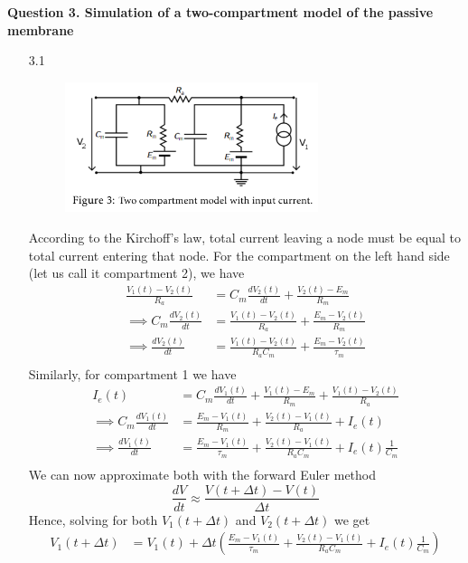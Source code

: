 \documentclass[12pt]{article}
\begin{document}
\noindent\textbf{Question 3. Simulation of a two-compartment model of the passive membrane}
\begin{enumerate}
\item[3.1]
\begin{figure}[h]
    \centering
    \includegraphics[width=0.7\textwidth]{circuit.png}
\end{figure}
According to the Kirchoff's law, total current leaving a node must be equal to total current entering that node. For the compartment 
on the left hand side (let us call it compartment 2), we have 
\begin{align*}
    \frac{V_{1}(t) - V_{2}(t)}{R_{a}} &= C_{m}\frac{dV_{2}(t)}{dt} + \frac{V_{2}(t)-E_{m}}{R_m}\\
    \implies C_{m}\frac{dV_{2}(t)}{dt} &= \frac{V_{1}(t) - V_{2}(t)}{R_{a}} + \frac{E_{m} - V_{2}(t)}{R_m}\\
    \implies \frac{dV_{2}(t)}{dt} &= \frac{V_{1}(t) - V_{2}(t)}{R_{a}C_{m}} + \frac{E_{m} - V_{2}(t)}{\tau_{m}}\\
\end{align*}
Similarly, for compartment 1 we have
\begin{align*}
    I_{e}(t) &= C_{m}\frac{dV_{1}(t)}{dt} + \frac{V_{1}(t)-E_{m}}{R_m} + \frac{V_{1}(t) - V_{2}(t)}{R_{a}}\\
    \implies C_{m}\frac{dV_{1}(t)}{dt} &= \frac{E_{m} - V_{1}(t)}{R_m} + \frac{V_{2}(t) - V_{1}(t)}{R_{a}} + I_{e}(t)\\
    \implies \frac{dV_{1}(t)}{dt} &= \frac{E_{m} - V_{1}(t)}{\tau_{m}} + \frac{V_{2}(t) - V_{1}(t)}{R_{a}C_{m}} + I_{e}(t)\frac{1}{C_{m}}\\
\end{align*}
We can now approximate both with the forward Euler method 
$$\frac{dV}{dt} \approx \frac{V(t+\Delta t)-V(t)}{\Delta t}$$
Hence, solving for both $V_{1}(t + \Delta t)$ and $V_{2}(t + \Delta t)$ we get
\begin{align*}
    V_{1}(t+\Delta t) &=  V_{1}(t) + \Delta t\left(\frac{E_{m} - V_{1}(t)}{\tau_{m}} + \frac{V_{2}(t) - V_{1}(t)}{R_{a}C_{m}} + I_{e}(t)\frac{1}{C_{m}}\right)\\

\end{align*}
\end{enumerate}
\end{document}
